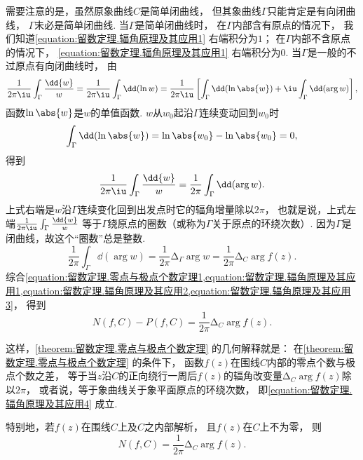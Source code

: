 需要注意的是，虽然原象曲线\(C\)是简单闭曲线，
但其象曲线\(\Gamma\)只能肯定是有向闭曲线，
\(\Gamma\)未必是简单闭曲线.
当\(\Gamma\)是简单闭曲线时，
在\(\Gamma\)内部含有原点的情况下，
我们知道\cref{equation:留数定理.辐角原理及其应用1} 右端积分为\(1\)；
在\(\Gamma\)内部不含原点的情况下，
\cref{equation:留数定理.辐角原理及其应用1} 右端积分为\(0\).
当\(\Gamma\)是一般的不过原点有向闭曲线时，
由\begin{equation*}
	\frac{1}{2\pi\iu} \int_\Gamma \frac{\dd{w}}{w}
	= \frac{1}{2\pi\iu} \int_\Gamma \dd(\ln w)
	= \frac{1}{2\pi\iu} \left[ \int_\Gamma \dd(\ln\abs{w}) + \iu \int_\Gamma \dd(\arg w) \right],
\end{equation*}
函数\(\ln\abs{w}\)是\(w\)的单值函数.
\(w\)从\(w_0\)起沿\(\Gamma\)连续变动回到\(w_0\)时\begin{equation*}
	\int_\Gamma \dd(\ln\abs{w})
	= \ln\abs{w_0} - \ln\abs{w_0} = 0,
\end{equation*}
得到\begin{equation}\label{equation:留数定理.辐角原理及其应用2}
	\frac{1}{2\pi\iu} \int_\Gamma \frac{\dd{w}}{w}
	= \frac{1}{2\pi} \int_\Gamma \dd(\arg w).
\end{equation}
上式右端是\(w\)沿\(\Gamma\)连续变化回到出发点时它的辐角增量除以\(2\pi\)，
也就是说，上式左端\(\frac{1}{2\pi\iu} \int_\Gamma \frac{\dd{w}}{w}\)
等于\(\Gamma\)绕原点的圈数（或称为\(\Gamma\)关于原点的环绕次数）.
因为\(\Gamma\)是闭曲线，故这个“圈数”总是整数.
\begin{equation}\label{equation:留数定理.辐角原理及其应用3}
	\frac{1}{2\pi} \int_\Gamma \dd(\arg w)
	= \frac{1}{2\pi} \increment_\Gamma \arg w
	= \frac{1}{2\pi} \increment_C \arg f(z).
\end{equation}
综合\cref{equation:留数定理.零点与极点个数定理1,equation:留数定理.辐角原理及其应用1,equation:留数定理.辐角原理及其应用2,equation:留数定理.辐角原理及其应用3}，
得到\begin{equation}\label{equation:留数定理.辐角原理及其应用4}
	N(f,C)-P(f,C) = \frac{1}{2\pi} \increment_C \arg f(z).
\end{equation}

这样，\cref{theorem:留数定理.零点与极点个数定理} 的几何解释就是：
在\cref{theorem:留数定理.零点与极点个数定理} 的条件下，
函数\(f(z)\)在围线\(C\)内部的零点个数与极点个数之差，
等于当\(z\)沿\(C\)的正向绕行一周后\(f(z)\)的辐角改变量\(\increment_C \arg f(z)\)除以\(2\pi\)，
或者说，等于象曲线关于象平面原点的环绕次数，
即\cref{equation:留数定理.辐角原理及其应用4} 成立.

特别地，若\(f(z)\)在围线\(C\)上及\(C\)之内部解析，
且\(f(z)\)在\(C\)上不为零，
则\begin{equation}\label{equation:留数定理.辐角原理及其应用5}
	N(f,C) = \frac{1}{2\pi} \increment_C \arg f(z).
\end{equation}

